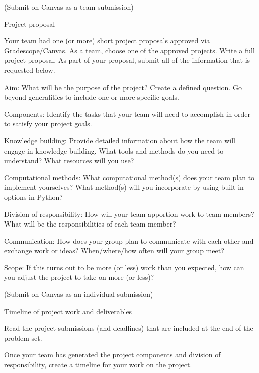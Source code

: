 \documentclass[12pt,letterpaper,noanswers]{exam}
\begin{document}
\begin{questions}

\item (Submit on Canvas as a team submission) 

Project proposal

Your team had one (or more) short project proposals approved via Gradescope/Canvas.  As a team, choose one of the approved projects.  Write a full project proposal.  As part of your proposal, submit all of the information that is requested below.

\begin{parts}
    \item Aim: What will be the purpose of the project?  Create a defined question.  Go beyond generalities to include one or more specific goals.
    \item Components: Identify the tasks that your team will need to accomplish in order to satisfy your project goals.
    \item Knowledge building: Provide detailed information about how the team will engage in knowledge building.  What tools and methods do you need to understand?  What resources will you use?
    \item Computational methods: What computational method(s) does your team plan to implement yourselves?  What method(s) will you incorporate by using built-in options in Python?
    \item Division of responsibility: How will your team apportion work to team members?  What will be the responsibilities of each team member?
    \item Communication: How does your group plan to communicate with each other and exchange work or ideas?  When/where/how often will your group meet?
    \item Scope: If this turns out to be more (or less) work than you expected, how can you adjust the project to take on more (or less)?

\end{parts}

\item (Submit on Canvas as an individual submission) 

Timeline of project work and deliverables

Read the project submissions (and deadlines) that are included at the end of the problem set.

Once your team has generated the project components and division of responsibility, create a timeline for your work on the project.


\end{questions}
\end{document}
